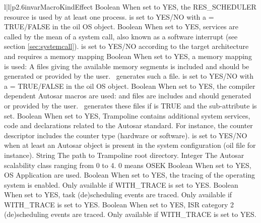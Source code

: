 \begin{longtableiii}{l|l|p{2.6in}}{var}{Macro}{Kind}{Effect}
  {Boolean}
  {When set to YES, the RES_SCHEDULER resource is used by at least one process.  is set to YES/NO with a  = TRUE/FALSE
  in the oil OS object.}
  {Boolean}
  {When set to YES, services are called by the mean of a system call, also known as a software interrupt (see section \ref{sec:systemcall}).
   is set to YES/NO according to the target architecture and requires a memory mapping}
  {Boolean}
  {When set to YES, a memory mapping is used: A  files giving the available memory segments is included and should be generated or provided by the user. \goil\ generates such a file.
   is set to YES/NO with a  = TRUE/FALSE
  in the oil OS object.}
  {Boolean}
  {When set to YES, the compiler dependent Autosar macros are used:  and  files are includes and should generated or provided by the user. \goil\ generates these  files if  is TRUE and the  sub-attribute is set.}
  {Boolean}
  {When set to YES, Trampoline contains additional system services, code and declarations related to the Autosar standard. For instance, the counter descriptor includes the counter type (hardware or software).
   is set to YES/NO when at least an Autosar object is present in the system configuration (oil file for instance).}
  {String}
  {The path to Trampoline root directory.}
  {Integer}
  {The Autosar scalability class ranging from 0 to 4. 0 means OSEK}
  {Boolean}
  {When set to YES, OS Application are used.}
  {Boolean}
  {When set to YES, the tracing of the operating system is enabled. Only available if WITH_TRACE is set to YES.}
  {Boolean}
  {When set to YES, task (de)scheduling events are traced. Only available if WITH_TRACE is set to YES.}
  {Boolean}
  {When set to YES, ISR category 2 (de)scheduling events are traced. Only available if WITH_TRACE is set to YES.}

\end{longtableiii}
